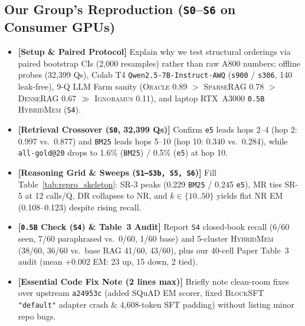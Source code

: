 \documentclass[sigconf,nonacm,10pt]{acmart}
\newcommand{\guide}[1]{\textcolor{GuideBorder}{\textbf{[#1]}}}
\begin{document}
\subsection{Our Group's Reproduction (\texttt{S0}--\texttt{S6} on Consumer GPUs)}
\begin{itemize}[leftmargin=*, nosep, topsep=2pt]
  \item \guide{Setup \& Paired Protocol} Explain why we test structural orderings via paired bootstrap CIs (2,000 resamples) rather than raw A800 numbers: offline probes (32,399 Qs), Colab T4 \texttt{Qwen2.5-7B-Instruct-AWQ} (\texttt{s900} / \texttt{s306}, 140 leak-free), 9-Q LLM Farm sanity (\textsc{Oracle} 0.89 $>$ \textsc{SparseRAG} 0.78 $>$ \textsc{DenseRAG} 0.67 $\gg$ \textsc{Ignoramus} 0.11), and laptop RTX~A3000 \texttt{0.5B} \textsc{HybridMem} (\texttt{S4}).
  \item \guide{Retrieval Crossover (\texttt{S0}, 32,399 Qs)} Confirm \texttt{e5} leads hops 2--4 (hop 2: 0.997 vs.\ 0.877) and \texttt{BM25} leads hops 5--10 (hop 10: 0.340 vs.\ 0.284), while \texttt{all-gold@20} drops to 1.6\% (\texttt{BM25}) / 0.5\% (\texttt{e5}) at hop 10.
  \item \guide{Reasoning Grid \& Sweeps (\texttt{S1--S3b, S5, S6})} Fill Table~\ref{tab:repro_skeleton}: \textsc{SR-3} peaks (0.229 \texttt{BM25} / 0.245 \texttt{e5}), \textsc{MR} ties \textsc{SR-5} at 12 calls/Q, \textsc{DR} collapses to \textsc{NR}, and $k \in \{10..50\}$ yields flat \textsc{NR} EM (0.108--0.123) despite rising recall.
  \item \guide{\texttt{0.5B} Check (\texttt{S4}) \& Table~3 Audit} Report \texttt{S4} closed-book recall (6/60 seen, 7/60 paraphrased vs.\ 0/60, 1/60 base) and 5-cluster \textsc{HybridMem} (38/60, 36/60 vs.\ base RAG 41/60, 43/60), plus our 40-cell Paper Table~3 audit (mean $+0.002$ EM: 23 up, 15 down, 2 tied).
  \item \guide{Essential Code Fix Note (2 lines max)} Briefly note clean-room fixes over upstream \texttt{a24953c} (added SQuAD EM scorer, fixed \textsc{BlockSFT} \texttt{"default"} adapter crash \& 4,608-token SFT padding) without listing minor repo bugs.
\end{itemize}
\end{document}
